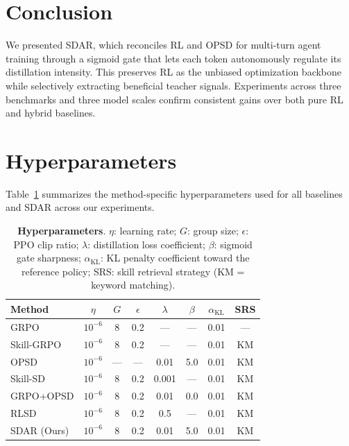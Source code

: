 \documentclass{article} %
\newcommand{\methodname}{\textsc{SDAR}\xspace}
\begin{document}
  \section{Conclusion}
  We presented \methodname{}, which reconciles RL and OPSD for multi-turn agent training through a sigmoid gate that lets each    
  token autonomously regulate its distillation intensity. This preserves RL as the unbiased optimization backbone while           
  selectively extracting beneficial teacher signals. Experiments across three benchmarks and three model scales confirm consistent
   gains over both pure RL and hybrid baselines.                                                                                 
\newpage


\newpage
\appendix
\renewcommand{\contentsname}{Table of Contents}
\setcounter{tocdepth}{2}
\tableofcontents
\newpage




\section{Hyperparameters}
Table~\ref{tab:hyperparams} summarizes the method-specific hyperparameters used for all baselines and \methodname{} across our experiments. 
\begin{table}[h]
\centering
\caption{\textbf{Hyperparameters}. $\eta$: learning rate; $G$: group size; $\epsilon$: PPO clip ratio; $\lambda$: distillation loss coefficient; $\beta$: sigmoid gate sharpness; $\alpha_{\mathrm{KL}}$: KL penalty coefficient toward the reference policy; SRS: skill retrieval strategy (KM = keyword matching).}
\label{tab:hyperparams}
\begin{tabular}{l c c c c c c c}
\toprule
\textbf{Method} & $\eta$ & $G$ & $\epsilon$ & $\lambda$ & $\beta$ & $\alpha_{\mathrm{KL}}$ & SRS \\
\midrule
GRPO & $10^{-6}$ & 8 & 0.2 & --- & --- & 0.01 & --- \\
Skill-GRPO & $10^{-6}$ & 8 & 0.2 & --- & --- & 0.01 & KM \\
OPSD & $10^{-6}$ & ---   & --- & 0.01 & 5.0 & 0.01 & KM \\
Skill-SD & $10^{-6}$ & 8 & 0.2 & 0.001 & --- & 0.01 & KM \\
GRPO+OPSD & $10^{-6}$ & 8 & 0.2 & 0.01 & 0.0 & 0.01 & KM \\
RLSD & $10^{-6}$ & 8 & 0.2 & 0.5 & --- & 0.01 & KM \\
\methodname{} (Ours) & $10^{-6}$ & 8 & 0.2 & 0.01 & 5.0 & 0.01 & KM \\
\bottomrule
\end{tabular}
\end{table}
\end{document}
